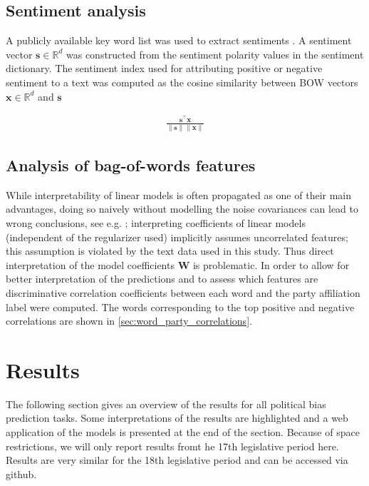 \documentclass{article}
\renewcommand{\vec}[1]{\mathbf{#1}}
\newcommand{\R}{\mathds{R}}
\begin{document}
\subsection{Sentiment analysis}\label{sec:sentiment_analysis_methods}
A publicly available key word list was used to extract sentiments \cite{remquahey2010}. A sentiment vector $\vec{s}\in\R^d$ was constructed from the sentiment polarity values in the sentiment dictionary. The sentiment index used for attributing positive or negative sentiment to a text was computed as the cosine similarity between BOW vectors $\vec{x}\in\R^d$ and $\vec{s}$

\begin{align}
\frac{\vec{s}^\top \vec{x}}{\|\vec{s}\|\|\vec{x}\|}
\end{align}

\subsection{Analysis of bag-of-words features}\label{sec:correlations_methods}
While interpretability of linear models is often propagated as one of their main advantages, doing so naively without modelling the noise covariances can lead to wrong conclusions, see e.g. \cite{Zien2009, Haufe2013}; interpreting coefficients of linear models (independent of the regularizer used) implicitly assumes uncorrelated features; this assumption is violated by the text data used in this study. Thus direct interpretation of the model coefficients $\vec{W}$ is problematic. In order to allow for better interpretation of the predictions and to assess which features are discriminative correlation coefficients between each word and the party affiliation label were computed. The words corresponding to the top positive and negative correlations are shown in \autoref{sec:word_party_correlations}.

\section{Results}\label{sec:results}

The following section gives an overview of the results for all political bias prediction tasks. Some interpretations of the results are highlighted and a web application of the models is presented at the end of the section. Because of space restrictions, we will only report results fromt he 17th legislative period here. Results are very similar for the 18th legislative period and can be accessed via github.
\end{document}
